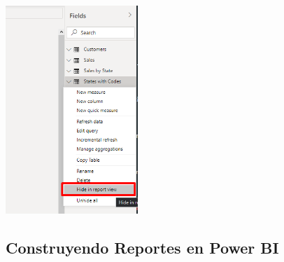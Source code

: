 \documentclass[12pt,letterpaper]{article}
\newcommand\tab[1][1cm]{\hspace*{#1}}
\begin{document}
\begin{enumerate}[\tab 1.]
        \begin{center}
            \includegraphics[width=5cm]{./img/img76.png}
        \end{center}
    \end{enumerate}
    
    \subsection{Construyendo Reportes en Power BI}
\end{document}

